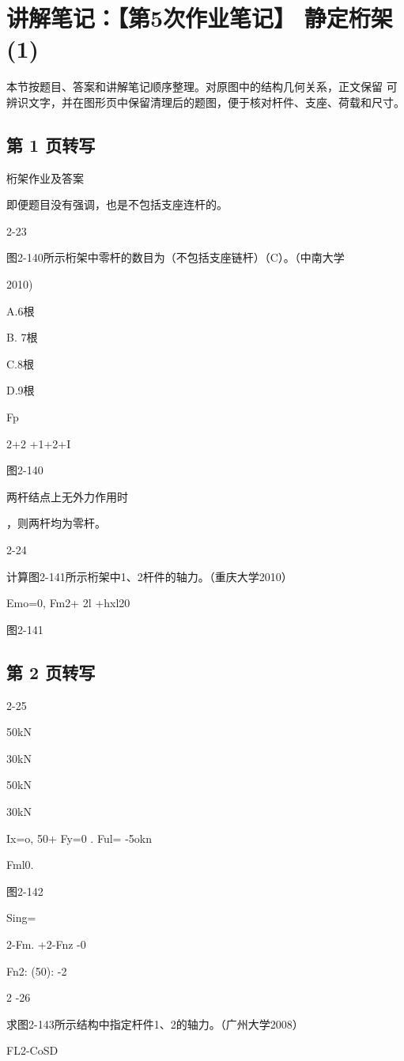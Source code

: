 \section{讲解笔记：【第5次作业笔记】 静定桁架(1)}
\begin{analysisbox}
本节按题目、答案和讲解笔记顺序整理。对原图中的结构几何关系，正文保留 可辨识文字，并在图形页中保留清理后的题图，便于核对杆件、支座、荷载和尺寸。
\end{analysisbox}
\subsection*{第 1 页转写}
桁架作业及答案

即便题目没有强调，也是不包括支座连杆的。

2-23

图2-140所示桁架中零杆的数目为（不包括支座链杆）（C）。（中南大学

2010)

A.6根

B. 7根

C.8根

D.9根

Fp

2+2 +1+2+I

图2-140

两杆结点上无外力作用时

，则两杆均为零杆。

2-24

计算图2-141所示桁架中1、2杆件的轴力。（重庆大学2010）

Emo=0, Fm2+ 2l +hxl20

图2-141

\subsection*{第 2 页转写}
2-25

50kN

30kN

50kN

30kN

Ix=o, 50+ Fy=0 . Ful= -5okn

Fml0.

图2-142

Sing=

2-Fm. +2-Fnz -0

Fn2: (50): -2

2 -26

求图2-143所示结构中指定杆件1、2的轴力。（广州大学2008）

FL2-CoSD

